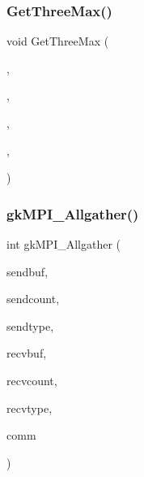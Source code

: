 \subsubsection{\texorpdfstring{Get\+Three\+Max()}{GetThreeMax()}}
{\footnotesize\ttfamily void Get\+Three\+Max (\begin{DoxyParamCaption}\item[{\hyperlink{a00876_aaa5262be3e700770163401acb0150f52}{idx\+\_\+t}}]{,  }\item[{\hyperlink{a00876_a1924a4f6907cc3833213aba1f07fcbe9}{real\+\_\+t} $\ast$}]{,  }\item[{\hyperlink{a00876_aaa5262be3e700770163401acb0150f52}{idx\+\_\+t} $\ast$}]{,  }\item[{\hyperlink{a00876_aaa5262be3e700770163401acb0150f52}{idx\+\_\+t} $\ast$}]{,  }\item[{\hyperlink{a00876_aaa5262be3e700770163401acb0150f52}{idx\+\_\+t} $\ast$}]{ }\end{DoxyParamCaption})}

\mbox{\label{a00951_a0b7a139ad6fb30c1ae40ac2b57188f1a}} 
\subsubsection{\texorpdfstring{gk\+M\+P\+I\+\_\+\+Allgather()}{gkMPI\_Allgather()}}
{\footnotesize\ttfamily int gk\+M\+P\+I\+\_\+\+Allgather (\begin{DoxyParamCaption}\item[{void $\ast$}]{sendbuf,  }\item[{\hyperlink{a00876_aaa5262be3e700770163401acb0150f52}{idx\+\_\+t}}]{sendcount,  }\item[{M\+P\+I\+\_\+\+Datatype}]{sendtype,  }\item[{void $\ast$}]{recvbuf,  }\item[{\hyperlink{a00876_aaa5262be3e700770163401acb0150f52}{idx\+\_\+t}}]{recvcount,  }\item[{M\+P\+I\+\_\+\+Datatype}]{recvtype,  }\item[{M\+P\+I\+\_\+\+Comm}]{comm }\end{DoxyParamCaption})}

\mbox{\label{a00951_a0b0b0098f344cad26f02c6f825bdde2c}} 
